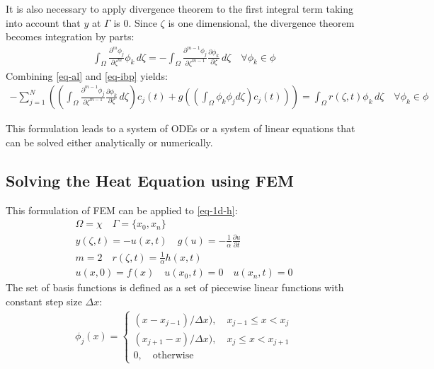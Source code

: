 It is also necessary to apply divergence theorem to the first integral term taking into account that \(y\) at \(\Gamma\) is 0.
Since \(\zeta\) is one dimensional, the divergence theorem becomes integration by parts:
\begin{gather}
\int_{\Omega} \frac{\partial^{m} \phi_{j}}{\partial \zeta^{m}} \phi_{k} \, d\zeta = - \int_{\Omega} \frac{\partial^{m-1} \phi_{j}}{\partial \zeta^{m-1}} \frac{\partial \phi_{k}}{\partial \zeta} \, d\zeta \quad \forall \phi_{k} \in \phi \label{eq-ibp}
\end{gather}
Combining \ref{eq-al} and \ref{eq-ibp} yields:
\begin{gather}
-\sum_{j = 1}^{N} ((\int_{\Omega} \frac{\partial^{m-1} \phi_{j}}{\partial \zeta^{m-1}} \frac{\partial \phi_{k}}{\partial \zeta} \, d\zeta) c_{j}(t) + g((\int_{\Omega} \phi_k \phi_j d\zeta) c_{j}(t)))  = \int_{\Omega}  r(\zeta, t) \phi_{k}        \, d\zeta \quad \forall \phi_{k} \in \phi \label{eq-fem}
\end{gather}

This formulation leads to a system of ODEs or a system of linear equations that can be solved either analytically or numerically.
\subsection{Solving the Heat Equation using FEM}
This formulation of FEM can be applied to \ref{eq-1d-h}:
\begin{gather}
\Omega = \chi \quad \Gamma = \{x_{0}, x_{n}\} \\
y(\zeta, t) = -u(x, t) \quad g(u) = -\frac{1}{\alpha} \frac{\partial u}{\partial t} \\
m = 2 \quad r(\zeta, t) = \frac{1}{\alpha} h(x,t) \\
u(x, 0) = f(x) \quad u(x_{0}, t) = 0 \quad u(x_{n}, t) = 0
\end{gather}
The set of basis functions is defined as a set of piecewise linear functions with constant step size \(\Delta x\):
\begin{gather}
    \phi_j(x)= 
\begin{cases}
    (x - x_{j-1}) / \Delta x), \quad x_{j-1} \leq x <  x_{j}\\
    (x_{j+1} - x) / \Delta x), \quad x_{j} \leq x <  x_{j + 1}\\
    0,              \quad \text{otherwise}
\end{cases}
\end{gather}
\cite{Gustafsson2011d}



